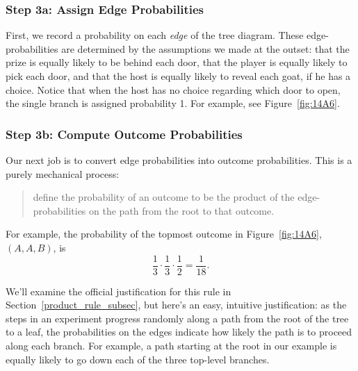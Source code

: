 \subsubsection{Step 3a: Assign Edge Probabilities}

First, we record a probability on each \emph{edge} of the tree
diagram.  These edge-probabilities are determined by the assumptions
we made at the outset: that the prize is equally likely to be behind
each door, that the player is equally likely to pick each door, and
that the host is equally likely to reveal each goat, if he has a
choice.  Notice that when the host has no choice regarding which door
to open, the single branch is assigned probability 1.  For example,
see Figure~\ref{fig:14A6}.
\iffalse

\begin{figure}

\graphic{Monty5}

\caption{The tree diagram for the Monty Hall Problem where edge
  weights denote the probability of that branch being taken, given that
  we are at the parent of that branch.  For example, if the car is
  behind door~$A$, then there is a 1/3~chance that the player's
  initial selection is door~$B$.}

\label{fig:14A5}

\end{figure}
\fi

\subsubsection{Step 3b: Compute Outcome Probabilities}

Our next job is to convert edge probabilities into outcome
probabilities.  This is a purely mechanical process:
\begin{quote}
define the probability of an outcome to be the product of the
edge-probabilities on the path from the root to that outcome.
\end{quote}
For example, the probability of the topmost outcome in
Figure~\ref{fig:14A6}, $(A, A, B)$, is
\begin{equation}\label{131312118}
\frac{1}{3} \cdot \frac{1}{3} \cdot \frac{1}{2} = \frac{1}{18}.
\end{equation}

We'll examine the official justification for this rule in
Section~\ref{product_rule_subsec}, but here's an easy, intuitive
justification: as the steps in an experiment progress randomly along a
path from the root of the tree to a leaf, the probabilities on the
edges indicate how likely the path is to proceed along each branch.
For example, a path starting at the root in our example is equally
likely to go down each of the three top-level branches.

